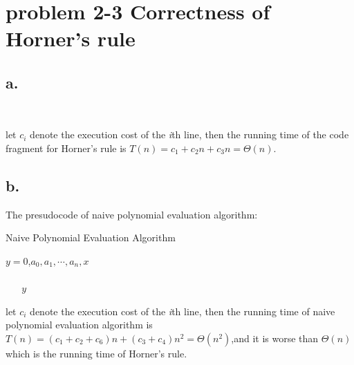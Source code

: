 \documentclass[oneside]{homework} %
\begin{document}
\maketitle
\newpage
\section{problem 2-3 Correctness of Horner's rule}
\subsection*{a.}
  \begin{algorithm}[htb]
  \begin{algorithmic}[1]
	\ENSURE ~ ~\\ 
	  \ENDFOR
  \end{algorithmic}
  \end{algorithm}
  
  let $c_{i}$ denote the execution cost of the \emph{i}th line, then the running time of the code fragment for Horner's rule is $T(n)=c_{1}+c_{2}n+c_{3}n=\Theta(n)$.
\subsection*{b.} The presudocode of naive polynomial evaluation algorithm:\\
  \begin{algorithm}[htb]
  \caption{Naive Polynomial Evaluation Algorithm}
  \begin{algorithmic}[1]
	\REQUIRE $y=0$,$a_0,a_1,\cdots,a_n,x$\\ 
	\ENSURE ~ ~\\ 
		\ENDFOR
	  \ENDFOR
	\LASTCON ~ ~ $y$\\
  \end{algorithmic}
  \end{algorithm}

let $c_{i}$ denote the execution cost of the \emph{i}th line, 
then the running time of naive polynomial evaluation algorithm is $T(n)=(c_{1}+c_{2}+c_{6})n+(c_{3}+c_{4})n^{2}=\Theta(n^2)$,and it is worse than $\Theta(n)$ which is the running time of Horner's rule.
\end{document}
